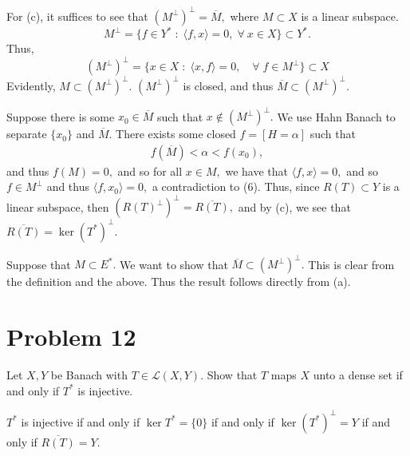 \documentclass[11pt]{article}
\begin{document}
\begin{solution}
     For (c), it suffices to see that $(M^\perp)^\perp = \overline{M},$ where $M\subset X$ is a linear subspace.
     \[M^\perp = \{f\in Y^* \; : \; \langle f, x\rangle = 0, \; \forall\: x\in X\}\subset Y^*.\] Thus, 
     \[(M^\perp)^\perp =\{x\in X \; : \; \langle x, f \rangle = 0, \quad \forall \; f\in M^\perp\} \subset X\] Evidently, $M \subset (M^\perp)^\perp.$ $(M^\perp)^\perp$ is closed, and thus $\overline{M}\subset (M^\perp)^\perp.$

     Suppose there is some $x_0\in \overline{M}$ such that $x\notin (M^\perp)^\perp.$ We use Hahn Banach to separate $\{x_0\}$ and $\overline{M}.$ There exists some closed $f = [H = \alpha]$ such that 
     \begin{align}
     f(\overline{M}) < \alpha < f(x_0),    
     \end{align}
      and thus $f(M) = 0,$ and so for all $x\in M,$ we have that $\langle f, x \rangle = 0,$ and so $f\in M^\perp$ and thus $\langle f, x_0 \rangle = 0,$ a contradiction to (6). Thus, since $R(T)\subset Y$ is a linear subspace, then $(R(T)^\perp)^\perp = \overline{R(T)},$ and by (c), we see that $\overline{R(T)} = \ker(T^*)^\perp.$

      Suppose that $M\subset E^*.$ We want to show that $\overline{M}\subset (M^\perp)^\perp.$ This is clear from the definition and the above. Thus the result follows directly from (a).
\end{solution}

\newpage
\section*{Problem 12}
\begin{problem}
    Let $X,Y$ be Banach with $T\in \mathcal{L}(X,Y).$ Show that $T$ maps $X$ unto a dense set if and only if $T^*$ is injective. 
\end{problem}
\begin{solution}
    $T^*$ is injective if and only if $\ker T^* = \{0\}$ if and only if $\ker(T^*)^\perp = Y$ if and only if $\overline{R(T)} = Y.$
\end{solution}
\end{document}
